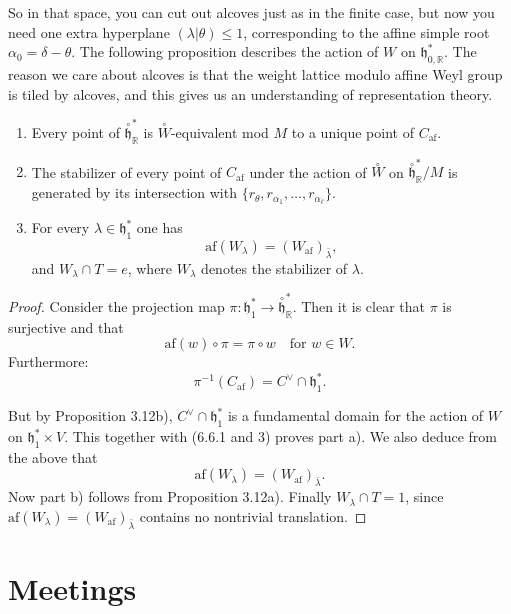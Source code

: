 \documentclass[12pt]{article}
\begin{document}
So in that space, you can cut out alcoves just as in the finite case, but now you need one extra hyperplane $(\lambda|\theta) \leq 1$, corresponding to the affine simple root $\alpha_0 = \delta - \theta$. The following proposition describes the action of $W$ on $\mathfrak{h}^*_{0,\mathbb{R}}$. The reason we care about alcoves is that the weight lattice modulo affine Weyl group is tiled by alcoves, and this gives us an understanding of representation theory.
\begin{proposition}[6.6]
\leavevmode
\begin{enumerate}[label=\alph*)]
\item Every point of $\overset{\circ}{\mathfrak{h}}^*_{\mathbb{R}}$ is $\overset{\circ}{W}$-equivalent mod $M$ to a unique point of $C_{\mathrm{af}}$.

\item The stabilizer of every point of $C_{\mathrm{af}}$ under the action of $\overset{\circ}{W}$ on 
$\overset{\circ}{\mathfrak{h}}^*_{\mathbb{R}} / M$ is generated by its intersection with 
$\{r_\theta, r_{\alpha_1}, \dots, r_{\alpha_\ell}\}$.

\item For every $\lambda \in \mathfrak{h}^*_1$ one has
\[
\mathrm{af}(W_\lambda) = (W_{\mathrm{af}})_{\bar{\lambda}},
\]
and $W_\lambda \cap T = e$, where $W_\lambda$ denotes the stabilizer of $\lambda$.
\end{enumerate}
\end{proposition}

\begin{proof}
Consider the projection map 
\(\pi : \mathfrak{h}^*_1 \to \overset{\circ}{\mathfrak{h}}^*_{\mathbb{R}}\). 
Then it is clear that $\pi$ is surjective and that 
\[
\mathrm{af}(w) \circ \pi = \pi \circ w \quad \text{for } w \in W.
\]
Furthermore:
\[
\pi^{-1}(C_{\mathrm{af}}) = C^\vee \cap \mathfrak{h}^*_1.
\]

But by Proposition 3.12b), $C^\vee \cap \mathfrak{h}^*_1$ is a fundamental domain for the action of $W$ on $\mathfrak{h}^*_1 \times V$. This together with (6.6.1 and 3) proves part a). We also deduce from the above that 
\[
\mathrm{af}(W_\lambda) = (W_{\mathrm{af}})_{\bar{\lambda}}.
\] 
Now part b) follows from Proposition 3.12a). Finally $W_\lambda \cap T = 1$, since $\mathrm{af}(W_\lambda) = (W_{\mathrm{af}})_{\bar{\lambda}}$ contains no nontrivial translation.
\end{proof}

\section{Meetings}
\end{document}
